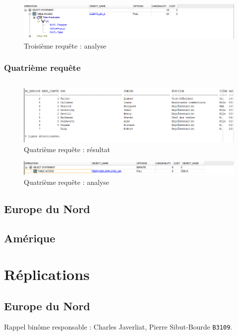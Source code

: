 \documentclass[10pt,a4paper]{article}
\theoremstyle{plain}
\begin{document}
\begin{figure}[!h]
    \centering
    \includegraphics[width=15cm]{EUS_req3_analyse.PNG}
    \caption{Troisième requête : analyse}
\end{figure}
\newpage

\subsubsection{Quatrième requête}
\inputminted{sql}{EUS_IV-A-4.sql}
\begin{figure}[!h]
    \centering
    \includegraphics[width=15cm]{EUS_req4.PNG}
    \caption{Quatrième requête : résultat}
\end{figure}

\begin{figure}[!h]
    \centering
    \includegraphics[width=15cm]{EUS_req4_analyse.PNG}
    \caption{Quatrième requête : analyse}
\end{figure}
\newpage

\subsection{Europe du Nord}
%
\newpage

\subsection{Amérique}
%
\newpage

\section{Réplications}
\subsection{Europe du Nord}
Rappel binôme responsable : Charles Javerliat, Pierre Sibut-Bourde \verb|B3109|.
\end{document}
